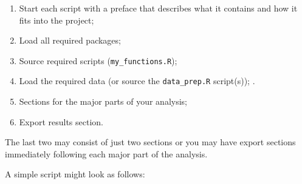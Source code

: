 \documentclass[12pt,letterpaper]{article}
\begin{document}
\begin{enumerate}

	\item Start each script with a preface that describes what it contains and how it fits into the 
	project;

	\item Load all required packages;

	\item Source required scripts (\texttt{my\_functions.R});

	\item Load the required data (or source the \texttt{data\_prep.R} script(s));
.
	\item Sections for the major parts of your analysis;

	\item Export results section.

\end{enumerate}
The last two may consist of just two sections or you may have export sections immediately following 
each major part of the analysis.

A simple script might look as follows:
\end{document}
